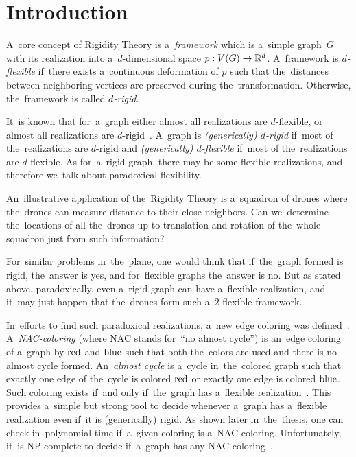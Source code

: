 
\chapter*{Introduction}
\setcounter{page}{1}


A~core concept of Rigidity Theory is a~\emph{framework} which is
a~simple graph~\(G\) with its realization
into a~\(d\)-dimensional space \(p: V(G) \to \mathbb{R}^d\).
A~framework is \emph{\( d \)-flexible} if~there exists
a~continuous deformation of \( p \) such that
the~distances between neighboring vertices are preserved during the~transformation.
Otherwise, the~framework is called \emph{\( d \)-rigid}.

It~is known that for~a~graph either almost all realizations are \( d \)-flexible,
or almost all realizations are \( d \)-rigid~\cite{generically_rigid_graphs}.
A~graph is \emph{(generically) \( d \)-rigid} if~most of the~realizations are \( d \)-rigid
and \emph{(generically) \( d \)-flexible} if~most of the~realizations are \( d \)-flexible.
%
As for~a~rigid graph,
there may be some flexible realizations,
and therefore we~talk about paradoxical flexibility.

An~illustrative application of the~Rigidity Theory is a~squadron of drones
where the~drones can measure distance to their close neighbors.
Can we~determine the~locations of all the~drones
up to translation and rotation of the~whole squadron
just from such information?

For~similar problems in~the~plane,
one would think that if~the~graph formed is rigid, the~answer is yes, and
for~flexible graphs the~answer is no.
But as stated above, paradoxically, even a~rigid graph can have a~flexible realization,
and it~may just happen that the~drones form such a~\( 2 \)-flexible framework.

In~efforts to find such paradoxical realizations,
a~new edge coloring was defined~\cite{legersky_original}.
A~\emph{NAC-coloring} (where NAC stands for~``no almost cycle'')
is an~edge coloring of a~graph by \( \text{red} \) and \( \text{blue} \)
such that both the~colors are used and there is no almost cycle formed.
An~\emph{almost cycle} is a~cycle in~the~colored graph such that exactly one
edge of the~cycle is colored \( \text{red} \) or exactly one edge is colored \( \text{blue} \).
Such coloring exists if~and only if~the~graph has a~flexible realization~\cite{legersky_original}.
This provides a~simple but strong tool to decide whenever a~graph has
a~flexible realization even if~it is (generically) rigid.
As shown later in~the~thesis, one can check in~polynomial time
if~a~given coloring is a~NAC-coloring.
Unfortunately, it~is NP-complete to decide if~a~graph has any NAC-coloring~\cite{np_complete}.

